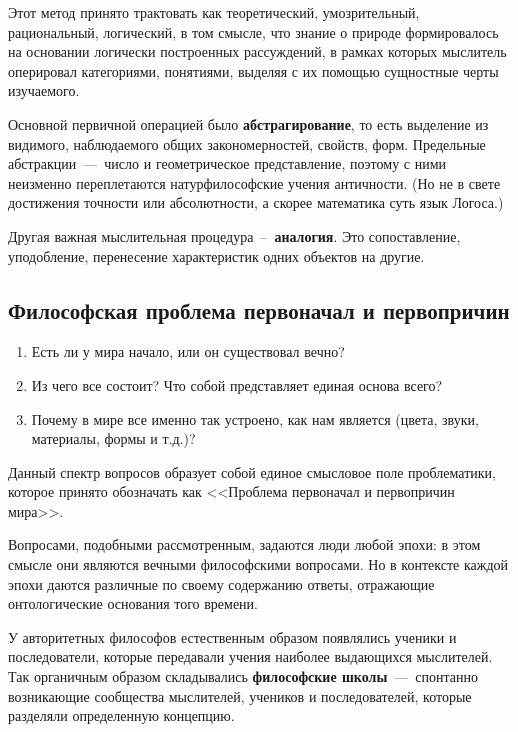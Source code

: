 \begin{enumerate}
Этот метод принято трактовать как теоретический, умозрительный, рациональный, логический, в том смысле, что знание о природе формировалось на основании логически
построенных рассуждений, в рамках которых мыслитель оперировал категориями,
понятиями, выделяя с их помощью сущностные черты изучаемого. 

Основной первичной операцией было \textbf{абстрагирование}, то есть выделение из видимого, наблюдаемого общих закономерностей, свойств, форм. Предельные абстракции~---~число и геометрическое представление, поэтому с ними неизменно переплетаются натурфилософские учения античности. (Но не в свете достижения точности или абсолютности, а скорее математика суть язык Логоса.)

Другая важная мыслительная процедура~--~\textbf{аналогия}. Это сопоставление, уподобление, перенесение характеристик одних объектов на другие.
\end{enumerate}

\subsection{Философская проблема первоначал и первопричин}

\begin{enumerate}
    \item Есть ли у мира начало, или он существовал вечно?
    \item Из чего все состоит? Что собой представляет единая основа всего?
    \item Почему в мире все именно так устроено, как нам является (цвета, звуки, материалы, формы и т.д.)?
\end{enumerate}
Данный спектр вопросов образует собой единое смысловое поле проблематики, которое принято обозначать как <<Проблема первоначал и первопричин мира>>. 

Вопросами, подобными рассмотренным, задаются люди любой эпохи: в этом смысле они являются вечными философскими вопросами. Но в контексте каждой эпохи даются различные по своему содержанию ответы, отражающие онтологические основания того времени.


У авторитетных философов естественным образом появлялись ученики и
последователи, которые передавали учения наиболее выдающихся мыслителей. Так
органичным образом складывались \textbf{философские школы}~---~спонтанно возникающие сообщества мыслителей, учеников и последователей, которые разделяли определенную концепцию. 

